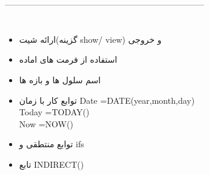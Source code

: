 -----------------------------------------------------------------------
\section{}
\begin{itemize}
\item
ارائه شیت(گزینه show/ view) و خروجی
\item
استفاده از فرمت های اماده
\item
اسم سلول ها و بازه ها
\item
توابع کار با زمان
Date =DATE(year,month,day)\\
Today =TODAY()\\
Now =NOW()\\
\item
توابع منتطقی و ifs
\item
تابع INDIRECT()

\end{itemize}